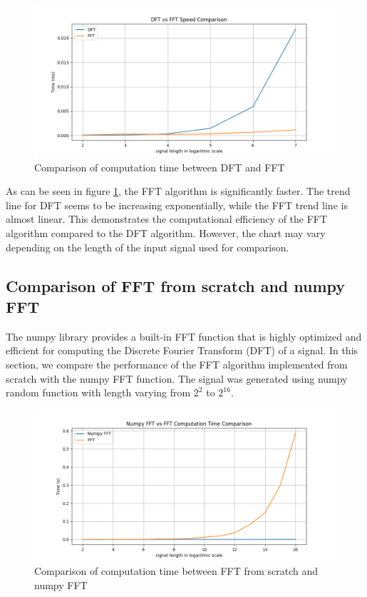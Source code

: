\documentclass[a4paper,12pt,fleqn]{article}
\begin{document}
\begin{figure}[H]
    \centering
    \includegraphics[width=1\textwidth]{dft_vs_fft.png}
    \caption{Comparison of computation time between DFT and FFT}
    \label{fig:fft_vs_dft}
\end{figure}

As can be seen in figure \ref{fig:fft_vs_dft}, the FFT algorithm is significantly faster. 
The trend line for DFT seems to be increasing exponentially, while the FFT trend line
is almost linear. This demonstrates the computational efficiency of the FFT algorithm
compared to the DFT algorithm. However, the chart may vary depending on the length of 
the input signal used for comparison.

\subsection{Comparison of FFT from scratch and numpy FFT}

\hspace{1 em}The numpy library provides a built-in FFT function that is highly optimized
and efficient for computing the Discrete Fourier Transform (DFT) of a signal. In this
section, we compare the performance of the FFT algorithm implemented from scratch with
the numpy FFT function. The signal was generated using numpy random function with length
varying from $2^2$ to $2^{16}$.

\begin{figure}[H]
    \centering
    \includegraphics[width=1\textwidth]{np_fft_fft.png}
    \caption{Comparison of computation time between FFT from scratch and numpy FFT}
    \label{fig:fft_vs_numpy_fft}
\end{figure}
\end{document}
